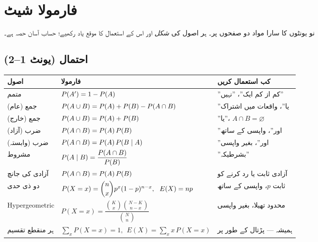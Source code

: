 
\section*{فارمولا شیٹ}

نو یونٹوں کا سارا مواد دو صفحوں پر۔ ہر اصول کی \emph{شکل} اور اس کے استعمال کا
موقع یاد رکھیے؛ حساب آسان حصہ ہے۔

\subsection*{احتمال (یونٹ \textenglish{1--2})}

\begin{center}
\begin{tabular}{@{}p{4.0cm} p{5.6cm} p{4.6cm}@{}}
\toprule
\textbf{اصول} & \textbf{فارمولا} & \textbf{کب استعمال کریں} \\
\midrule
متمم        & \(P\!\left(A'\right)=1-P\!\left(A\right)\) & ''کم از کم ایک''، ''نہیں'' \\
جمع (عام)   & \(P\!\left(A\cup B\right)=P\!\left(A\right)+P\!\left(B\right)-P\!\left(A\cap B\right)\) & ''یا''، واقعات میں اشتراک \\
جمع (خارج)  & \(P\!\left(A\cup B\right)=P\!\left(A\right)+P\!\left(B\right)\) & ''یا''، \(A\cap B=\varnothing\) \\
ضرب (آزاد)  & \(P\!\left(A\cap B\right)=P\!\left(A\right)P\!\left(B\right)\) & ''اور''، واپسی کے ساتھ \\
ضرب (وابستہ)& \(P\!\left(A\cap B\right)=P\!\left(A\right)P\!\left(B\mid A\right)\) & ''اور''، بغیر واپسی \\
مشروط       & \(P\!\left(A\mid B\right)=\dfrac{P\!\left(A\cap B\right)}{P\!\left(B\right)}\) & ''بشرطیکہ'' \\
آزادی کی جانچ & \(P\!\left(A\cap B\right)=P\!\left(A\right)P\!\left(B\right)\) & آزادی ثابت یا رد کرنے کو \\
\midrule
دو ذی حدی   & \(P(X=x)=\dbinom{n}{x}p^{x}(1-p)^{n-x},\ \ E(X)=np\) & ثابت \(p\)، واپسی کے ساتھ \\
\textenglish{Hypergeometric} & \(P(X=x)=\dfrac{\binom{K}{x}\binom{N-K}{n-x}}{\binom{N}{n}}\) & محدود تھیلا، بغیر واپسی \\
ہر منقطع تقسیم & \(\sum_x P(X=x)=1,\ \ E(X)=\sum_x x\,P(X=x)\) & ہمیشہ --- پڑتال کے طور پر \\
\bottomrule
\end{tabular}
\end{center}

